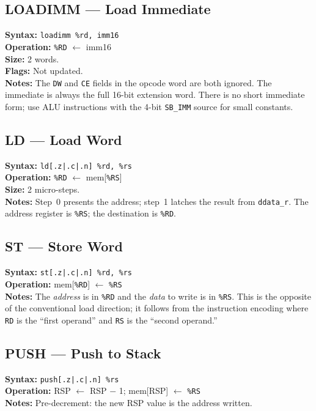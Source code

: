 \documentclass[a4paper,12pt]{report}
\newcommand{\asm}[1]{\texttt{#1}}
\newcommand{\field}[1]{\texttt{\small #1}}
\newcommand{\reg}[1]{\texttt{\%#1}}
\newcommand{\signal}[1]{\texttt{#1}}
\begin{document}
\subsection*{LOADIMM --- Load Immediate}
\textbf{Syntax:} \asm{loadimm \%rd, imm16} \\
\textbf{Operation:} \reg{RD} $\leftarrow$ imm16 \\
\textbf{Size:} 2 words. \\
\textbf{Flags:} Not updated. \\
\textbf{Notes:} The \field{DW} and \field{CE} fields in the opcode word are both ignored. The immediate is always the full 16-bit extension word. There is no short immediate form; use ALU instructions with the 4-bit \field{SB\_IMM} source for small constants.

\subsection*{LD --- Load Word}
\textbf{Syntax:} \asm{ld[.z|.c|.n] \%rd, \%rs} \\
\textbf{Operation:} \reg{RD} $\leftarrow$ mem[\reg{RS}] \\
\textbf{Size:} 2 micro-steps. \\
\textbf{Notes:} Step~0 presents the address; step~1 latches the result from \signal{ddata\_r}. The address register is \reg{RS}; the destination is \reg{RD}.

\subsection*{ST --- Store Word}
\textbf{Syntax:} \asm{st[.z|.c|.n] \%rd, \%rs} \\
\textbf{Operation:} mem[\reg{RD}] $\leftarrow$ \reg{RS} \\
\textbf{Notes:} The \emph{address} is in \reg{RD} and the \emph{data} to write is in \reg{RS}. This is the opposite of the conventional load direction; it follows from the instruction encoding where \field{RD} is the ``first operand'' and \field{RS} is the ``second operand.''

\subsection*{PUSH --- Push to Stack}
\textbf{Syntax:} \asm{push[.z|.c|.n] \%rs} \\
\textbf{Operation:} RSP $\leftarrow$ RSP $-$ 1; mem[RSP] $\leftarrow$ \reg{RS} \\
\textbf{Notes:} Pre-decrement: the new RSP value is the address written.
\end{document}
